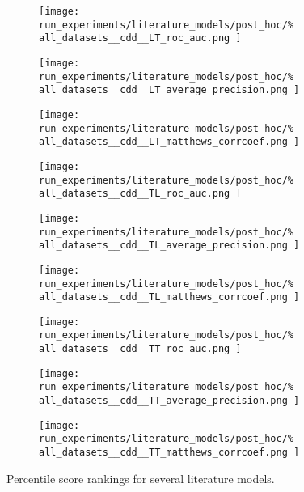 \begin{figure*}
    \centering
    \begin{subfigure}{0.32\textwidth}
        \texttt{[image: 
            run\_experiments/literature\_models/post\_hoc/\%
            all\_datasets\_\_cdd\_\_LT\_roc\_auc.png
        ]}
    \end{subfigure}
    \begin{subfigure}{0.32\textwidth}
        \texttt{[image: 
            run\_experiments/literature\_models/post\_hoc/\%
            all\_datasets\_\_cdd\_\_LT\_average\_precision.png
        ]}
    \end{subfigure}
    \begin{subfigure}{0.32\textwidth}
        \texttt{[image: 
            run\_experiments/literature\_models/post\_hoc/\%
            all\_datasets\_\_cdd\_\_LT\_matthews\_corrcoef.png
        ]}
    \end{subfigure}

    \begin{subfigure}{0.32\textwidth}
        \texttt{[image: 
            run\_experiments/literature\_models/post\_hoc/\%
            all\_datasets\_\_cdd\_\_TL\_roc\_auc.png
        ]}
    \end{subfigure}
    \begin{subfigure}{0.32\textwidth}
        \texttt{[image: 
            run\_experiments/literature\_models/post\_hoc/\%
            all\_datasets\_\_cdd\_\_TL\_average\_precision.png
        ]}
    \end{subfigure}
    \begin{subfigure}{0.32\textwidth}
        \texttt{[image: 
            run\_experiments/literature\_models/post\_hoc/\%
            all\_datasets\_\_cdd\_\_TL\_matthews\_corrcoef.png
        ]}
    \end{subfigure}

    \begin{subfigure}{0.32\textwidth}
        \texttt{[image: 
            run\_experiments/literature\_models/post\_hoc/\%
            all\_datasets\_\_cdd\_\_TT\_roc\_auc.png
        ]}
    \end{subfigure}
    \begin{subfigure}{0.32\textwidth}
        \texttt{[image: 
            run\_experiments/literature\_models/post\_hoc/\%
            all\_datasets\_\_cdd\_\_TT\_average\_precision.png
        ]}
    \end{subfigure}
    \begin{subfigure}{0.32\textwidth}
        \texttt{[image: 
            run\_experiments/literature\_models/post\_hoc/\%
            all\_datasets\_\_cdd\_\_TT\_matthews\_corrcoef.png
        ]}
    \end{subfigure}
    \caption{Percentile score rankings for several literature models.}
    \label{fig:cdd_literature}
\end{figure*}


